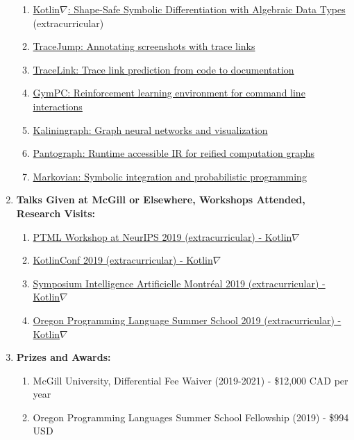 \documentclass[11pt]{article}
\begin{document}
\begin{enumerate}
        \begin{enumerate}
            \item \href{https://github.com/breandan/kotlingrad}{Kotlin$\nabla$: Shape-Safe Symbolic Differentiation with Algebraic Data Types} (extracurricular)
            \item \href{https://github.com/acejump/tracejump}{TraceJump: Annotating screenshots with trace links}
            \item \href{https://github.com/breandan/tracelink}{TraceLink: Trace link prediction from code to documentation}
            \item \href{https://github.com/breandan/gym-pc}{GymPC: Reinforcement learning environment for command line interactions}
            \item \href{https://github.com/breandan/kaliningraph}{Kaliningraph: Graph neural networks and visualization}
            \item \href{https://github.com/breandan/pantograph}{Pantograph: Runtime accessible IR for reified computation graphs}
            \item \href{https://github.com/breandan/markovian}{Markovian: Symbolic integration and probabilistic programming}
        \end{enumerate}

        \item \textbf{Talks Given at McGill or Elsewhere, Workshops Attended, Research Visits:}

        \begin{enumerate}
            \item \href{https://program-transformations.github.io/}{PTML Workshop at NeurIPS 2019 (extracurricular) - Kotlin$\nabla$}
            \item \href{https://kotlinconf.com/2019/talks/}{KotlinConf 2019 (extracurricular) - Kotlin$\nabla$}
            \item \href{https://montrealaisymposium.wordpress.com/accepted-papers-2019/}{Symposium Intelligence Artificielle Montr\'eal 2019 (extracurricular) - Kotlin$\nabla$}
            \item \href{https://www.cs.uoregon.edu/research/summerschool/summer19/topics.php}{Oregon Programming Language Summer School 2019 (extracurricular) - Kotlin$\nabla$}
        \end{enumerate}

        \item \textbf{Prizes and Awards:}

        \begin{enumerate}
            \item McGill University, Differential Fee Waiver (2019-2021) - \$12,000 CAD per year
            \item Oregon Programming Languages Summer School Fellowship (2019) - \$994 USD
        \end{enumerate}


\end{enumerate}
\end{document}
